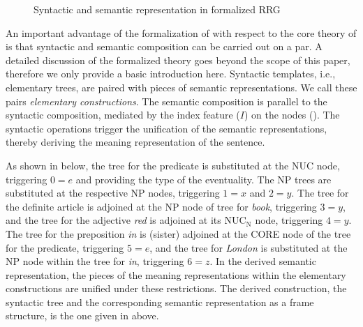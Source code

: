 \documentclass[output=paper,colorlinks,citecolor=brown]{langscibook}
\begin{document}
\begin{figure}[H]
\caption{Syntactic and semantic representation in formalized RRG}\label{ex:frrg.repr:Balogh}
\end{figure}

An important advantage of the formalization of  with respect to the core theory of  is that syntactic and semantic composition can be carried out on a par. A detailed discussion of the formalized theory goes beyond the scope of this paper, therefore we only provide a basic introduction here. Syntactic templates, i.e., elementary trees, are paired with pieces of semantic representations. We call these pairs \textit{elementary constructions}. The semantic composition is parallel to the syntactic composition, mediated by the index feature ($I$) on the nodes (). The syntactic operations \citep[][]{kallm:etal:13} trigger the unification of the semantic representations, thereby deriving the meaning representation of the sentence. 

As shown in  below, the tree for the predicate is substituted at the NUC node, triggering $\boxed{0}=e$ and providing the type of the eventuality. The NP trees are substituted at the respective NP nodes, triggering $\boxed{1}=x$ and $\boxed{2}=y$. The tree for the definite article is adjoined at the NP node of tree for \textit{book}, triggering $\boxed{3}=y$,  and the tree for the adjective \textit{red} is adjoined at its NUC$_{\text{N}}$ node, triggering $\boxed{4}=y$. The tree for the preposition \textit{in} is (sister) adjoined at the CORE node of the tree for the predicate, triggering $\boxed{5}=e$, and the tree for \textit{London} is substituted at the NP node within the tree for \textit{in}, triggering $\boxed{6}=z$. In the derived semantic representation, the pieces of the meaning representations within the elementary constructions are unified under these restrictions. The derived construction, the  syntactic tree and the corresponding semantic representation as a frame structure, is the one given in  above.
\end{document}
